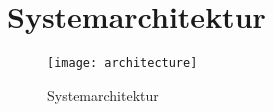 \chapter{Systemarchitektur}

\begin{figure}
\label{fig:architecture}
\begin{center}
    \texttt{[image: architecture]}
\end{center}
\caption{Systemarchitektur}
\end{figure}